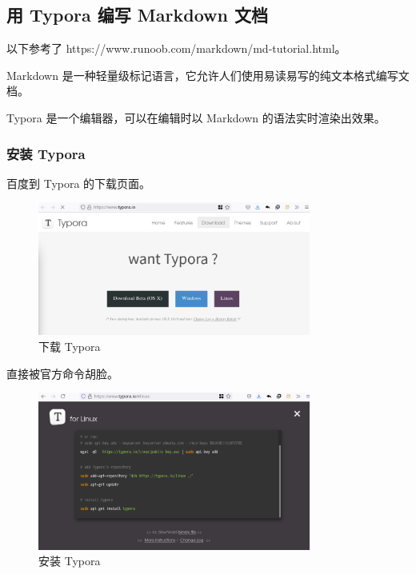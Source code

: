 \documentclass[UTF-8]{ctexart}
\begin{document}
			
		\newpage
		
		\subsection{用 Typora 编写 Markdown 文档}
		
			以下参考了 https://www.runoob.com/markdown/md-tutorial.html。
				
			Markdown 是一种轻量级标记语言，它允许人们使用易读易写的纯文本格式编写文档。
			
			Typora 是一个编辑器，可以在编辑时以 Markdown 的语法实时渲染出效果。
				
			\subsubsection{安装 Typora}
			
				百度到 Typora 的下载页面。
				
				\begin{figure}[H]
					\centering
					\includegraphics[width=0.8\textwidth]{fig/typora_download.png}
					\caption*{下载 Typora}
				\end{figure}
			
				直接被官方命令胡脸。
			
				\begin{figure}[H]
					\centering
					\includegraphics[width=0.8\textwidth]{fig/typora_install.png}
					\caption*{安装 Typora}
				\end{figure}
			
\end{document}
